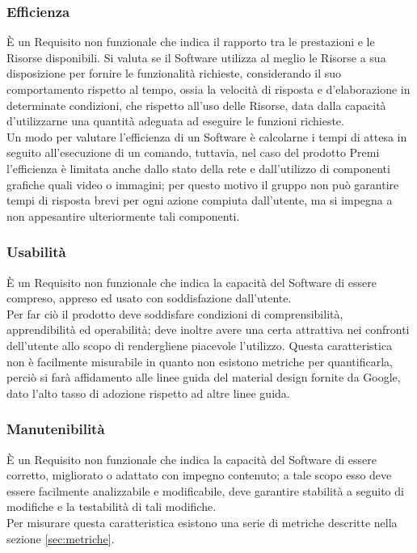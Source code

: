 \subsubsection{Efficienza}
È un Requisito non funzionale che indica il rapporto tra le prestazioni e le Risorse disponibili.
Si valuta se il Software utilizza al meglio le Risorse a sua disposizione per fornire le funzionalità richieste, considerando il suo comportamento rispetto al tempo, ossia la velocità di risposta e d'elaborazione in determinate condizioni, che rispetto all’uso delle Risorse, data dalla capacità d'utilizzarne una quantità adeguata ad eseguire le funzioni richieste. \\
Un modo per valutare l’efficienza di un Software è calcolarne i tempi di attesa in seguito all’esecuzione di un comando, tuttavia, nel caso del prodotto Premi l'efficienza è limitata anche dallo stato della rete e dall'utilizzo di componenti grafiche quali video o immagini; per questo motivo il gruppo non può garantire tempi di risposta brevi per ogni azione compiuta dall’utente, ma si impegna a non appesantire ulteriormente tali componenti.

\subsubsection{Usabilità}
È un Requisito non funzionale che indica la capacità del Software di essere compreso, appreso ed usato con soddisfazione dall'utente. \\
Per far ciò il prodotto deve soddisfare condizioni di comprensibilità, apprendibilità ed operabilità; deve inoltre avere una certa attrattiva nei confronti dell'utente allo scopo di rendergliene piacevole l’utilizzo. Questa caratteristica non è facilmente misurabile in quanto non esistono metriche per quantificarla, perciò si farà affidamento alle linee guida del material design fornite da Google, dato l'alto tasso di adozione rispetto ad altre linee guida.

\subsubsection{Manutenibilità}
È un Requisito non funzionale che indica la capacità del Software di essere corretto, migliorato o adattato con impegno contenuto; a tale scopo esso deve essere facilmente analizzabile e modificabile, deve garantire stabilità a seguito di modifiche e la testabilità di tali modifiche.  \\
Per misurare questa caratteristica esistono una serie di metriche descritte nella sezione \ref{sec:metriche}.

